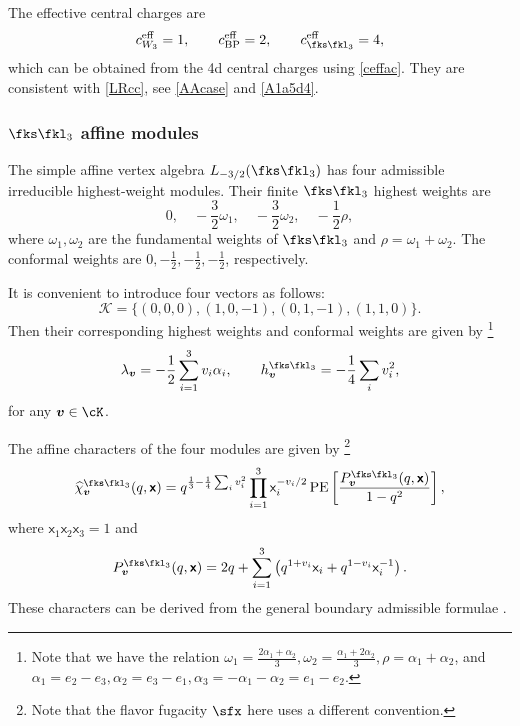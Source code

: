 \documentclass[a4paper,11pt]{article}
\theoremstyle{definition}
\theoremstyle{definition}
\theoremstyle{remark}
\newcommand{\ceff}{c^\text{eff}}
\newcommand{\be}{\begin{equation}}
\newcommand{\ee}{\end{equation}}
\begin{document}
  The effective central charges are
    \be
 \ceff_{W_3}=1, \qquad   \ceff_{\text{BP}}=2, \qquad\ceff_{\fks\fkl_3}=4,
  \ee
 which can be obtained from the 4d central charges using \eqref{ceffac}.    They are   consistent with  {\eqref{LRcc}}, see   \eqref{AAcase} and  \eqref{A1a5d4}. 
 
   
%  
  
\subsubsection{$\fks\fkl_3$ affine modules}
 
 The simple affine vertex algebra $L_{-3/2}(\fks\fkl_3)$ has four  admissible irreducible highest-weight modules. Their finite $\fks\fkl_3$ highest weights are 
\be 
0,\quad-\frac32\omega_1,\quad-\frac32\omega_2,\quad-\frac12\rho,
\ee
where $ \omega_1,\omega_2$ are the   fundamental weights of $\fks\fkl_3$ and $\rho=\omega_1+\omega_2$.
  The conformal weights are $0,-\frac12,-\frac12,-\frac12$, respectively.  

It is convenient  to introduce four vectors as follows:
\be 
 \mathcal{K} = \{(0,0,0), (1,0,-1), (0,1,-1), (1,1,0)\}.
\ee
Then their  corresponding highest weights and conformal weights are given by 
\footnote{Note that we have the relation $
\omega_1=\frac{2\alpha_1+\alpha_2}{3},
 \omega_2=\frac{\alpha_1+2\alpha_2}{3},
 \rho=\alpha_1+\alpha_2
$, and $\alpha_1=e_2-e_3,  \alpha_2=e_3-e_1, \alpha_3=-\alpha_1-\alpha_2=e_1-e_2 $.
} 
\be 
\lambda_{\bm v} = -\frac{1}{2}\sum_{i=1}^3 v_i\alpha_i, \qquad h^{\fks\fkl_3}_{\bm v} = -\frac{1}{4}\sum_i v_i^2,
\ee
 for any $\bm v\in \cK$.
 
  

The affine characters of the four modules are given by  \footnote{Note that the flavor fugacity $\sfx$ here uses a different convention. }
\be \label{sl3affc}
\widehat\chi_{\bm v}^{\fks\fkl_3}(q,\boldsymbol{\mathsf{x}})
=q^{\frac13-\frac14\sum_i v_i^2}\prod_{i=1}^3\mathsf{x}_i^{-v_i/2}
\operatorname{PE}\left[\frac{P^{\fks\fkl_3}_{\bm v}(q,\boldsymbol{\mathsf{x}})}{1-q^2}\right],
\ee
where $\mathsf{x}_1\mathsf{x}_2\mathsf{x}_3=1$ and
\be 
P^{\fks\fkl_3}_{\bm v}(q,\boldsymbol{\mathsf{x}})
=2q+\sum_{i=1}^3\left(q^{1+v_i}\mathsf{x}_i+q^{1-v_i}\mathsf{x}_i^{-1}\right).
\ee 
  These characters can be derived from the general  boundary admissible formulae  \cite{KacWakimotoBoundary2017}.
\end{document}
